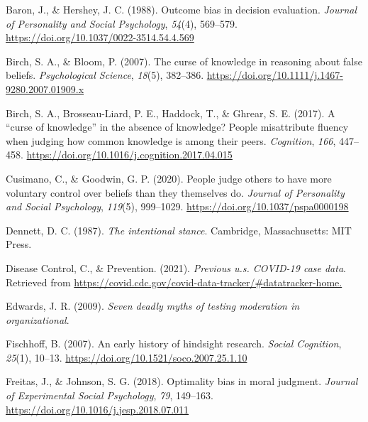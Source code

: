 \documentclass[
  man,floatsintext]{apa6}
\newlength{\cslhangindent}
\newlength{\cslentryspacingunit} %
\newenvironment{CSLReferences}[2] %
 {%
  \setlength{\parindent}{0pt}
  \ifodd #1
  \let\oldpar\par
  \def\par{\hangindent=\cslhangindent\oldpar}
  \fi
  \setlength{\parskip}{#2\cslentryspacingunit}
 }%
 {}
\begin{document}
\hypertarget{refs}{}
\begin{CSLReferences}{1}{0}
\leavevmode{}%
Baron, J., \& Hershey, J. C. (1988). Outcome bias in decision evaluation. \emph{Journal of Personality and Social Psychology}, \emph{54}(4), 569--579. \url{https://doi.org/10.1037/0022-3514.54.4.569}

\leavevmode{}%
Birch, S. A., \& Bloom, P. (2007). The curse of knowledge in reasoning about false beliefs. \emph{Psychological Science}, \emph{18}(5), 382--386. \url{https://doi.org/10.1111/j.1467-9280.2007.01909.x}

\leavevmode{}%
Birch, S. A., Brosseau-Liard, P. E., Haddock, T., \& Ghrear, S. E. (2017). A {``curse of knowledge''} in the absence of knowledge? People misattribute fluency when judging how common knowledge is among their peers. \emph{Cognition}, \emph{166}, 447--458. \url{https://doi.org/10.1016/j.cognition.2017.04.015}

\leavevmode{}%
Cusimano, C., \& Goodwin, G. P. (2020). People judge others to have more voluntary control over beliefs than they themselves do. \emph{Journal of Personality and Social Psychology}, \emph{119}(5), 999--1029. \url{https://doi.org/10.1037/pspa0000198}

\leavevmode{}%
Dennett, D. C. (1987). \emph{The intentional stance}. Cambridge, Massachusetts: MIT Press.

\leavevmode{}%
Disease Control, C., \& Prevention. (2021). \emph{Previous u.s. COVID-19 case data}. Retrieved from \url{https://covid.cdc.gov/covid-data-tracker/\#datatracker-home.}

\leavevmode{}%
Edwards, J. R. (2009). \emph{Seven deadly myths of testing moderation in organizational}.

\leavevmode{}%
Fischhoff, B. (2007). An early history of hindsight research. \emph{Social Cognition}, \emph{25}(1), 10--13. \url{https://doi.org/10.1521/soco.2007.25.1.10}

\leavevmode{}%
Freitas, J., \& Johnson, S. G. (2018). Optimality bias in moral judgment. \emph{Journal of Experimental Social Psychology}, \emph{79}, 149--163. \url{https://doi.org/10.1016/j.jesp.2018.07.011}


\end{CSLReferences}
\end{document}
